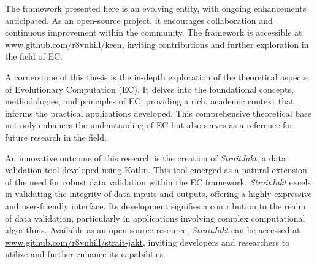     The framework presented here is an evolving entity, with ongoing enhancements anticipated. As an open-source 
    project, it encourages collaboration and continuous improvement within the community. The framework is accessible at 
    \url{www.github.com/r8vnhill/keen}, inviting contributions and further exploration in the field of EC.

    A cornerstone of this thesis is the in-depth exploration of the theoretical aspects of Evolutionary Computation 
    (EC). It delves into the foundational concepts, methodologies, and principles of EC, providing a rich, academic 
    context that informs the practical applications developed. This comprehensive theoretical base not only enhances the 
    understanding of EC but also serves as a reference for future research in the field.
    
    An innovative outcome of this research is the creation of \textit{StraitJakt}, a data validation tool developed 
    using Kotlin. This tool emerged as a natural extension of the need for robust data validation within the EC 
    framework. \textit{StraitJakt} excels in validating the integrity of data inputs and outputs, offering a highly 
    expressive and user-friendly interface. Its development signifies a contribution to the realm of data validation, 
    particularly in applications involving complex computational algorithms. Available as an open-source resource, 
    \textit{StraitJakt} can be accessed at \url{www.github.com/r8vnhill/strait-jakt}, inviting developers and 
    researchers to utilize and further enhance its capabilities.
